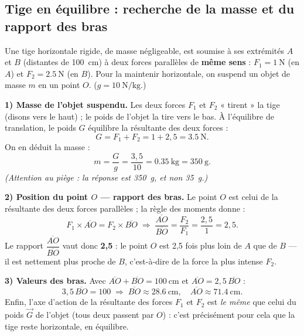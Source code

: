 \documentclass[11pt,a4paper]{article}
\newcommand{\vv}[1]{\vec{#1}}
\begin{document}
\subsection{Tige en équilibre : recherche de la masse et du rapport des bras}
\begin{exemple}
Une tige horizontale rigide, de masse négligeable, est soumise à ses extrémités $A$ et $B$
(distantes de \SI{100}{\centi\metre}) à deux forces parallèles de \textbf{même sens} :
$F_1 = \SI{1}{\newton}$ (en $A$) et $F_2 = \SI{2.5}{\newton}$ (en $B$). Pour la maintenir horizontale,
on suspend un objet de masse $m$ en un point $O$. ($g=\SI{10}{\newton\per\kilogram}$.)

\smallskip
\textbf{1) Masse de l'objet suspendu.} Les deux forces $F_1$ et $F_2$ « tirent » la tige (disons vers le
haut) ; le poids de l'objet la tire vers le bas. À l'équilibre de translation, le poids $G$ équilibre la
résultante des deux forces :
\[
G = F_1 + F_2 = 1 + 2{,}5 = \SI{3.5}{\newton}.
\]
On en déduit la masse :
\[
m = \frac{G}{g} = \frac{3{,}5}{10} = \SI{0.35}{\kilogram} = \SI{350}{\gram}.
\]
\emph{(Attention au piège : la réponse est \SI{350}{\gram}, et non \SI{35}{\gram}.)}

\textbf{2) Position du point $O$ — rapport des bras.} Le point $O$ est celui de la résultante des deux
forces parallèles ; la règle des moments donne :
\[
F_1\times\overline{AO} = F_2\times\overline{BO}
\;\Longrightarrow\;
\frac{\overline{AO}}{\overline{BO}} = \frac{F_2}{F_1} = \frac{2{,}5}{1} = 2{,}5.
\]
Le rapport $\dfrac{\overline{AO}}{\overline{BO}}$ vaut donc \textbf{2,5} : le point $O$ est 2,5 fois plus
loin de $A$ que de $B$ — il est nettement plus proche de $B$, c'est-à-dire de la force la plus
intense $F_2$.

\textbf{3) Valeurs des bras.} Avec $\overline{AO}+\overline{BO}=\SI{100}{\centi\metre}$ et
$\overline{AO}=2{,}5\,\overline{BO}$ :
\[
3{,}5\,\overline{BO}=100\;\Rightarrow\;\overline{BO}\approx\SI{28.6}{\centi\metre},\quad
\overline{AO}\approx\SI{71.4}{\centi\metre}.
\]
Enfin, l'axe d'action de la résultante des forces $F_1$ et $F_2$ est \emph{le même} que celui du poids
$\vv G$ de l'objet (tous deux passent par $O$) : c'est précisément pour cela que la tige reste
horizontale, en équilibre.
\end{exemple}

\end{document}
